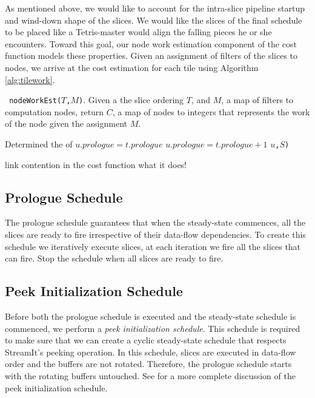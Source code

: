 As mentioned above, we would like to account for the intra-slice
pipeline startup and wind-down shape of the slices.  We would like the
slices of the final schedule to be placed like a Tetris-master would
align the falling pieces he or she encounters.  Toward this goal, our
node work estimation component of the cost function models these
properties.  Given an assignment of filters of the slices to nodes,
we arrive at the cost estimation for each tile using Algorithm
\ref{alg:tilework}. 

\begin{algorithm}
\caption{nodeWorkEst} \label{alg:tilework} {\tt
nodeWorkEst(}$T${\tt ,}$M${\tt )}. Given a the slice ordering $T$, and
$M$, a map of filters to computation nodes, return $C$, a map of nodes
to integers that represents the work of the node given the assignment $M$.
\begin{algorithmic}
\STATE Determined the  of 
\STATE $u.prologue = t.prologue$
\ELSE
\STATE $u.prologue = t.prologue + 1$ 
\ENDIF 
{}$u${\tt ,}$S${\tt )}
\ENDFOR
\end{algorithmic}
\end{algorithm}


link contention in the cost function
what it does!

\subsection{Prologue Schedule}
The prologue schedule guarantees that when the steady-state commences,
all the slices are ready to fire irrespective of their data-flow
dependencies.  To create this schedule we iteratively execute slices,
at each iteration we fire all the slices that can fire.  Stop the
schedule when all slices are ready to fire.

\subsection{Peek Initialization Schedule}
Before both the prologue schedule is executed and the steady-state
schedule is commenced, we perform a {\it peek initialization
schedule}.  This schedule is required to make sure that we can create
a cyclic steady-state schedule that respects StreamIt's peeking
operation.  In this schedule, slices are executed in data-flow order
and the buffers are not rotated.  Therefore, the prologue schedule
starts with the rotating buffers untouched.  See
\cite{streamitcc} for a more complete discussion of the peek
initialization schedule.


